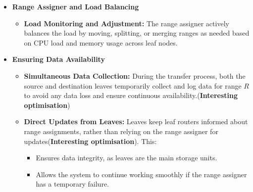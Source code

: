 \begin{itemize}
    \item \textbf{Range Assigner and Load Balancing}
    \begin{itemize}
        \item \textbf{Load Monitoring and Adjustment:} The range assigner actively balances the load by moving, splitting, or merging ranges as needed based on CPU load and memory usage across leaf nodes.
        
    \end{itemize}

    \item \textbf{Ensuring Data Availability}
    \begin{itemize}
        \item \textbf{Simultaneous Data Collection:} During the transfer process, both the source and destination leaves temporarily collect and log data for range $R$ to avoid any data loss and ensure continuous availability.(\textbf{Interesting optimisation})
        \item \textbf{Direct Updates from Leaves:} Leaves keep leaf routers informed about range assignments, rather than relying on the range assigner for updates(\textbf{Interesting optimisation}). This:
        \begin{itemize}
            \item Ensures data integrity, as leaves are the main storage units.
            \item Allows the system to continue working smoothly if the range assigner has a temporary failure.
        \end{itemize}
    \end{itemize}
\end{itemize}

